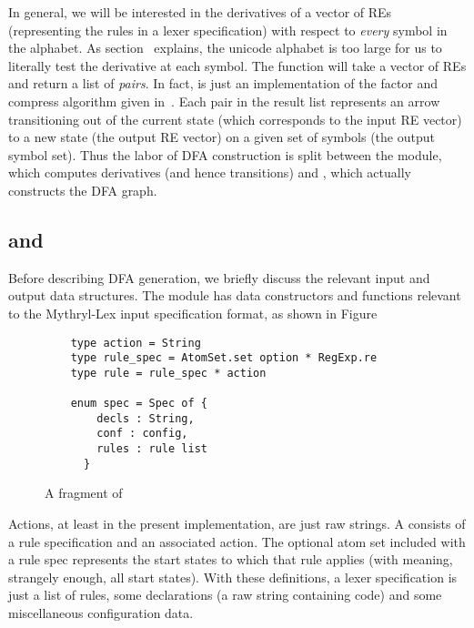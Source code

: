 In general, we will be interested in the derivatives of a vector of REs
(representing the rules in a lexer specification) with respect to \emph{every}
symbol in the alphabet.  As section~ explains, the unicode
alphabet is too large for us to literally test the derivative at each symbol. 
The  function will take a vector of REs and return a list of
 \emph{pairs}.  In fact, 
is just an implementation of the factor and compress algorithm given
in~.  Each pair in the result list represents an arrow
transitioning out of the current state (which corresponds to the input RE
vector) to a new state (the output RE vector) on a given set of symbols (the
output symbol set).  Thus the labor of DFA construction is split between the
 module, which computes derivatives (and hence transitions) and
, which actually constructs the DFA graph.

\subsection{ and }

Before describing DFA generation, we briefly discuss the relevant input and
output data structures.  The  module has data constructors and
functions relevant to \eg the Mythryl-Lex input specification format, as shown in
Figure~

\begin{figure}
\begin{verbatim}
    type action = String
    type rule_spec = AtomSet.set option * RegExp.re
    type rule = rule_spec * action

    enum spec = Spec of {
        decls : String,
        conf : config,
        rules : rule list
      }
\end{verbatim}
\caption{A fragment of }\label{fig:lex-spec}
\end{figure}

Actions, at least in the present implementation, are just raw strings.  A
 consists of a rule specification and an associated action.  The
optional atom set included with a rule spec represents the start states
to which that rule applies (with  meaning, strangely enough, all start
states).  With these definitions, a lexer specification is just a list of
rules, some declarations (a raw string containing code) and some miscellaneous
configuration data.

